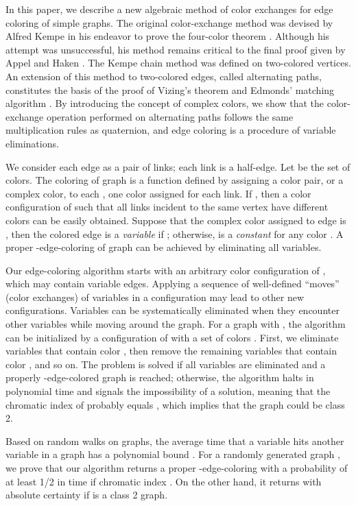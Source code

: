 \documentclass[11pt]{article}
\begin{document}
In this paper, we describe a new algebraic method of color exchanges for edge coloring of simple graphs. The original color-exchange method was devised by Alfred Kempe in his endeavor to prove the four-color theorem \cite{kempe1879geographical}. Although his attempt was unsuccessful, his method remains critical to the final proof given by Appel and Haken \cite{appel1989every}. The Kempe chain method was defined on two-colored vertices. An extension of this method to two-colored edges, called alternating paths, constitutes the basis of the proof of Vizing's theorem and Edmonds' matching algorithm \cite{edmonds1987paths}. By introducing the concept of complex colors, we show that the color-exchange operation performed on alternating paths follows the same multiplication rules as quaternion, and edge coloring is a procedure of variable eliminations. 

We consider each edge  as a pair of links; each link is a half-edge. Let  be the set of colors. The coloring of graph  is a function  defined by assigning a color pair, or a complex color, to each , one color assigned for each link. If , then a color configuration  of  such that all links incident to the same vertex have different colors can be easily obtained. Suppose that the complex color assigned to edge  is , then the colored edge  is a {\it variable} if ; otherwise,  is a {\it constant} for any color . A proper -edge-coloring of graph  can be achieved by eliminating all variables.

Our edge-coloring algorithm starts with an arbitrary color configuration  of , which may contain variable edges. Applying a sequence of well-defined ``moves'' (color exchanges) of variables in a configuration may lead to other new configurations. Variables can be systematically eliminated when they encounter other variables while moving around the graph. For a graph  with , the algorithm can be initialized by a configuration of  with a set of  colors . First, we eliminate variables that contain color , then remove the remaining variables that contain color , and so on. The problem is solved if all variables are eliminated and a properly -edge-colored graph is reached; otherwise, the algorithm halts in polynomial time and signals the impossibility of a solution, meaning that the chromatic index of  probably equals , which implies that the graph  could be class 2.

Based on random walks on graphs, the average time that a variable hits another variable in a graph has a polynomial bound \cite{aldous2002reversible} \cite{Aleliunas1979random} \cite{lovsz1993random} . For a randomly generated graph , we prove that our algorithm returns a proper -edge-coloring with a probability of at least 1/2 in  time if chromatic index . On the other hand, it returns with absolute certainty if  is a class 2 graph. 
\end{document}
